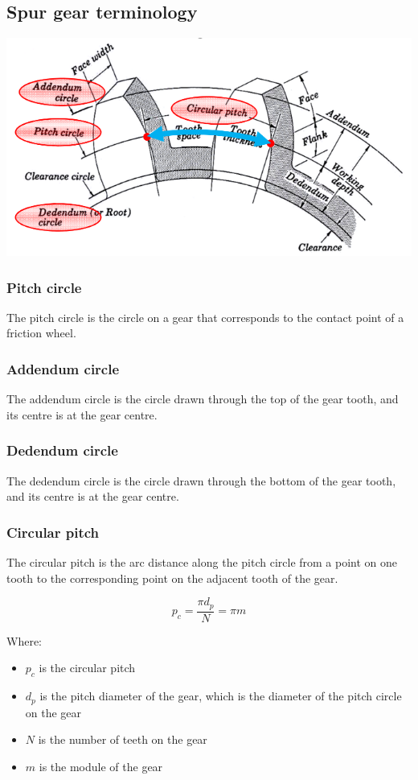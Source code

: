 \documentclass[11pt]{article}
\begin{document}
\subsection{Spur gear terminology}
\label{sec:org149aed7}
\begin{center}
\includegraphics[width=.9\linewidth]{./images/spur-gear-terminology.png}
\end{center}
\subsubsection{Pitch circle}
\label{sec:org7eb84b1}
The pitch circle is the circle on a gear that corresponds to the contact point of a friction wheel.
\subsubsection{Addendum circle}
\label{sec:orgdf8b1ea}
The addendum circle is the circle drawn through the top of the gear tooth, and its centre is at the gear centre.
\subsubsection{Dedendum circle}
\label{sec:orgf6d5bbe}
The dedendum circle is the circle drawn through the bottom of the gear tooth, and its centre is at the gear centre.

 \newpage
\subsubsection{Circular pitch}
\label{sec:org8521448}
The circular pitch is the arc distance along the pitch circle from a point on one tooth to the corresponding point on the adjacent tooth of the gear.

\[p_c = \frac{\pi d_p}{N} = \pi m\]

Where:
\begin{itemize}
\item \(p_c\) is the circular pitch
\item \(d_p\) is the pitch diameter of the gear, which is the diameter of the pitch circle on the gear
\item \(N\) is the number of teeth on the gear
\item \(m\) is the module of the gear
\end{itemize}
\end{document}

